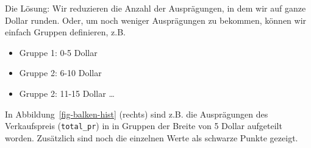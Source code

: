 \documentclass[
  letterpaper,
]{scrbook}
\providecommand{\tightlist}{%
  \setlength{\itemsep}{0pt}\setlength{\parskip}{0pt}}\usepackage{longtable,booktabs,array}
\theoremstyle{definition}
\theoremstyle{definition}
\theoremstyle{definition}
\theoremstyle{remark}
\begin{document}
Die Lösung: Wir reduzieren die Anzahl der Ausprägungen, in dem wir auf
ganze Dollar runden. Oder, um noch weniger Ausprägungen zu bekommen,
können wir einfach Gruppen definieren, z.B.

\begin{itemize}
\tightlist
\item
  Gruppe 1: 0-5 Dollar
\item
  Gruppe 2: 6-10 Dollar
\item
  Gruppe 2: 11-15 Dollar \ldots{}
\end{itemize}

In Abbildung~\ref{fig-balken-hist} (rechts) sind z.B. die Ausprägungen
des Verkaufspreis (\texttt{total\_pr}) in in Gruppen der Breite von 5
Dollar aufgeteilt worden. Zusätzlich sind noch die einzelnen Werte als
schwarze Punkte gezeigt.
\end{document}
